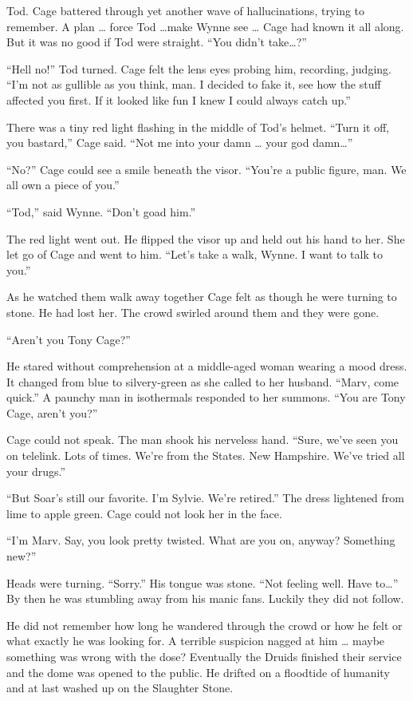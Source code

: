 Tod. Cage battered through yet another wave of hallucinations, trying to remember. A plan … force Tod …make Wynne see … Cage had known it all along. But it was no good if Tod were straight. ``You didn't take…?''

``Hell no!'' Tod turned. Cage felt the lens eyes probing him, recording, judging. ``I'm not as gullible as you think, man. I decided to fake it, see how the stuff affected you first. If it looked like fun I knew I could always catch up.''

There was a tiny red light flashing in the middle of Tod's helmet. ``Turn it off, you bastard,'' Cage said. ``Not me into your damn … your god damn…''

``No?'' Cage could see a smile beneath the visor. ``You're a public figure, man. We all own a piece of you.''

``Tod,'' said Wynne. ``Don't goad him.''

The red light went out. He flipped the visor up and held out his hand to her. She let go of Cage and went to him. ``Let's take a walk, Wynne. I want to talk to you.''

As he watched them walk away together Cage felt as though he were turning to stone. He had lost her. The crowd swirled around them and they were gone.

``Aren't you Tony Cage?''

He stared without comprehension at a middle-aged woman wearing a mood dress. It changed from blue to silvery-green as she called to her husband. ``Marv, come quick.'' A paunchy man in isothermals responded to her summons. ``You are Tony Cage, aren't you?''

Cage could not speak. The man shook his nerveless hand. ``Sure, we've seen you on telelink. Lots of times. We're from the States. New Hampshire. We've tried all your drugs.''

``But Soar's still our favorite. I'm Sylvie. We're retired.'' The dress lightened from lime to apple green. Cage could not look her in the face.

``I'm Marv. Say, you look pretty twisted. What are you on, anyway? Something new?''

Heads were turning. ``Sorry.'' His tongue was stone. ``Not feeling well. Have to…'' By then he was stumbling away from his manic fans. Luckily they did not follow.

He did not remember how long he wandered through the crowd or how he felt or what exactly he was looking for. A terrible suspicion nagged at him … maybe something was wrong with the dose? Eventually the Druids finished their service and the dome was opened to the public. He drifted on a floodtide of humanity and at last washed up on the Slaughter Stone.

